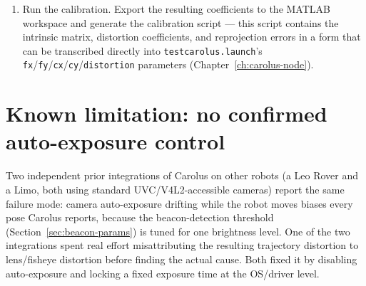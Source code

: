\documentclass[11pt]{report}
\begin{document}
\begin{enumerate}
  \textbf{Found missing again, \texttt{2026-09-02}}, same lab PC, same
  R2025b install: searching the toolstrip for ``camera calibrator'' returned
  only tangential hits (functions, blocks, videos, forum answers referencing
  the toolbox) and no app result --- the toolbox was not present despite the
  2026-08-11 note above. This followed a same-day MATLAB R2026a install
  alongside the existing R2025b (\texttt{sudo ./install}, a separate,
  coexisting version under \texttt{/usr/local/MATLAB/}) and a licensing-service
  crash requiring a full reboot to clear; whether the reinstall specifically
  caused the toolbox to disappear from R2025b, or it had simply never been
  completed after the 2026-08-11 note, was not determined --- reinstalled the
  same way (Home~$\to$~Get More Apps~$\to$~search ``Computer Vision
  Toolbox''~$\to$~Install) and confirmed present immediately after. If this
  recurs a third time, check whether installing a second MATLAB version on
  this machine reliably resets per-version Add-Ons rather than treating it as
  a one-off.
  \item Run the calibration. Export the resulting coefficients to the MATLAB
  workspace and generate the calibration script --- this script contains the
  intrinsic matrix, distortion coefficients, and reprojection errors in a
  form that can be transcribed directly into \texttt{testcarolus.launch}'s
  \texttt{fx}/\texttt{fy}/\texttt{cx}/\texttt{cy}/\texttt{distortion}
  parameters (Chapter~\ref{ch:carolus-node}).
\end{enumerate}

\section{Known limitation: no confirmed auto-exposure control}
\label{sec:no-auto-exposure-control}

Two independent prior integrations of Carolus on other robots (a Leo Rover
and a Limo, both using standard UVC/V4L2-accessible cameras) report the same
failure mode: camera auto-exposure drifting while the robot moves biases
every pose Carolus reports, because the beacon-detection threshold
(Section~\ref{sec:beacon-params}) is tuned for one brightness level. One of the
two integrations spent real effort misattributing the resulting trajectory
distortion to lens/fisheye distortion before finding the actual cause. Both
fixed it by disabling auto-exposure and locking a fixed exposure time at the
OS/driver level.
\end{document}
